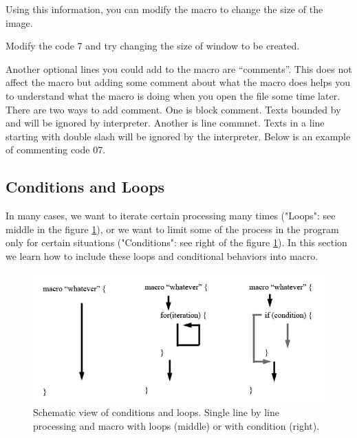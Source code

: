 \begin{indentCom}

\end{indentCom}
Using this information, you can modify the macro to change the size of the image.

\begin{indentexercise}{1}
Modify the code 7 and try changing the size of window to be created.
\end{indentexercise}

Another optional lines you could add to the macro are ``comments''. This does not affect the macro but adding some comment about what the macro does helps you to understand what the macro is doing when you open the file some time later. There are two ways to add comment. One is block comment. Texts bounded by \ilcom{ /*} and \ilcom{*/} will be ignored by interpreter. Another is line commnet. Texts in a line starting with double slash \ilcom{//} will be ignored by the interpreter. Below is an example of commenting code 07. 



\subsection{Conditions and Loops}
In many cases, we want to iterate certain processing many times ("Loops": see middle in the figure \ref{fig_scriptscheme}), or we want to limit some of the process in the program only for certain situations ("Conditions": see right of the figure \ref{fig_scriptscheme}). In this section we learn how to include these loops and conditional behaviors into macro. 

\begin{figure}[htbp]
\begin{center}
\includegraphics[scale=0.55]{fig/fig23_1_ScriptSchemes.png}
\caption{Schematic view of conditions and loops. Single line by line processing and macro with loops (middle) or with condition (right).} \label{fig_scriptscheme}
\end{center}
\end{figure}

